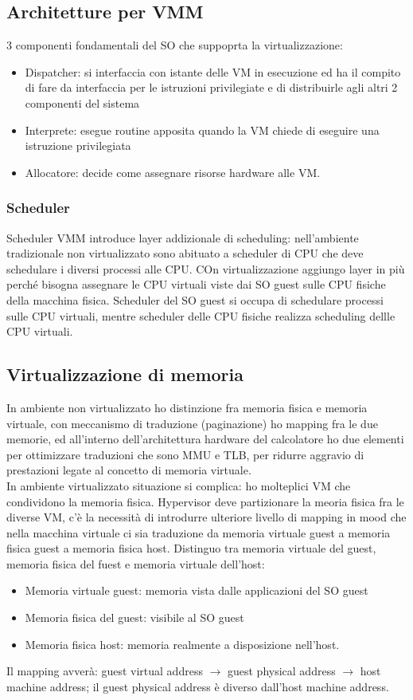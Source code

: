 \documentclass{article}
\begin{document}
\subsection{Architetture per VMM}
3 componenti fondamentali del SO che suppoprta la virtualizzazione:
\begin{itemize}
\item Dispatcher: si interfaccia con istante delle VM in esecuzione ed ha il compito di fare da interfaccia per le istruzioni privilegiate e di distribuirle agli altri 2 componenti del sistema
\item Interprete: esegue routine apposita quando la VM chiede di eseguire una istruzione privilegiata
\item Allocatore: decide come assegnare risorse hardware alle VM.
\end{itemize}
\subsubsection{Scheduler}
Scheduler VMM introduce layer addizionale di scheduling: nell'ambiente tradizionale non virtualizzato sono abituato a scheduler di CPU che deve schedulare i diversi processi alle CPU. COn virtualizzazione aggiungo layer in più perché bisogna assegnare le CPU virtuali viste dai SO guest sulle CPU fisiche della macchina fisica. Scheduler del SO guest si occupa di schedulare processi sulle 	CPU virtuali, mentre scheduler delle CPU fisiche realizza scheduling dellle CPU virtuali.
\subsection{Virtualizzazione di memoria}
In ambiente non virtualizzato ho distinzione fra memoria fisica e memoria virtuale, con meccanismo di traduzione (paginazione) ho mapping fra le due memorie, ed all'interno dell'architettura hardware del calcolatore ho due elementi per ottimizzare traduzioni che sono MMU e TLB, per ridurre aggravio di prestazioni legate al concetto di memoria virtuale.\\ In ambiente virtualizzato situazione si complica: ho molteplici VM che condividono la memoria fisica. Hypervisor deve partizionare la meoria fisica fra le diverse VM, c'è la necessità di introdurre ulteriore livello di mapping in mood che nella macchina virtuale ci sia traduzione da memoria virtuale guest a memoria fisica guest a memoria fisica host. Distinguo tra memoria virtuale del guest, memoria fisica del fuest e memoria virtuale dell'host:
\begin{itemize}
\item Memoria virtuale guest: memoria vista dalle applicazioni del SO guest
\item Memoria fisica del guest: visibile al SO guest
\item Memoria fisica host: memoria realmente a disposizione nell'host.
\end{itemize}
Il mapping avverà: guest virtual address $\rightarrow$ guest physical address $\rightarrow$ host machine address; il guest physical address è diverso dall'host machine address.
\end{document}
